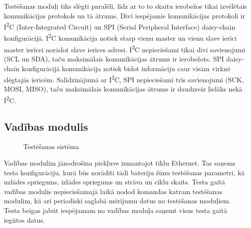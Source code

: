 \documentclass[12pt,fleqn,titlepage,oneside]{article}
\begin{document}
Testēšanas moduļi tiks slēgti paralēli, līdz ar to to skaitu ierobežos tikai izvēlētais komunikācijas protokols un tā ātrums.
Divi iespējamie komunikācijas protokoli ir I\textsuperscript{2}C (Inter-Integrated Circuit) un SPI (Serial Peripheral Interface) daisy-chain konfigurācijā.
I\textsuperscript{2}C komunikācija notiek starp vienu master un vienu slave ierīci master ierīcei norādot slave ierīces adresi.
I\textsuperscript{2}C nepieciešami tikai divi savienojumi (SCL un SDA), taču maksimālais komunikācijas ātrums ir ierobežots.
SPI daisy-chain konfigurācijā komunikācija notiek bīdot informāciju caur visām virknē slēgtajās ierīcēm. Salīdzīnājumā ar I\textsuperscript{2}C, SPI nepieciešami trīs savienojumi (SCK, MOSI, MISO), taču maksimālais komunikācijas ātrums ir daudzreiz lielāks nekā I\textsuperscript{2}C.

\subsection{Vadības modulis}

\begin{figure}[h]
	\centering
	\caption{Testēšanas sistēma}
\end{figure}

Vadības modulim jānodrošina piekļuve izmantojot tīklu Ethernet.
Tas saņems testa konfigurāciju, kurā būs norādīti tādi bateriju šūnu testēšanas parametri, kā uzlādes spriegums, izlādes spriegums un strāva un ciklu skaits.
Testa gaitā vadības modulis nepieciešamajā laikā nodod komandas katram testēšanas modulim, kā arī periodiski saglabā mērījumu datus no testēšanas moduļiem.
Testa beigas jabūt iespējamam no vadības moduļa saņemt visus testa gaitā iegūtos datus.
\end{document}
